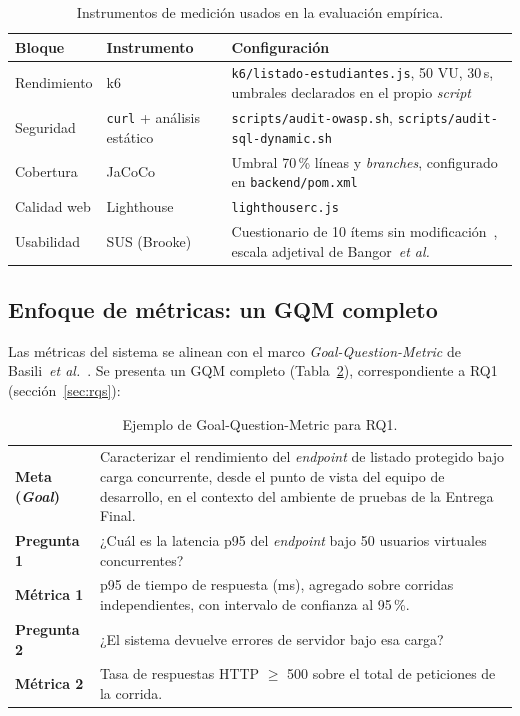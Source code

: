 \documentclass[11pt,a4paper]{article}
\newcommand{\ruta}[1]{\texttt{\footnotesize #1}}
\begin{document}
\begin{table}[htbp]
\centering
\caption{Instrumentos de medición usados en la evaluación empírica.}
\label{tab:instrumentos}
\begin{tabular}{@{}llp{7cm}@{}}
\toprule
\textbf{Bloque} & \textbf{Instrumento} & \textbf{Configuración} \\
\midrule
Rendimiento & k6 & \ruta{k6/listado-estudiantes.js}, 50 VU, 30\,s, umbrales declarados en el propio \emph{script} \\
Seguridad & \texttt{curl} + análisis estático & \ruta{scripts/audit-owasp.sh}, \ruta{scripts/audit-sql-dynamic.sh} \\
Cobertura & JaCoCo & Umbral 70\,\% líneas y \emph{branches}, configurado en \ruta{backend/pom.xml} \\
Calidad web & Lighthouse & \ruta{lighthouserc.js} \\
Usabilidad & SUS (Brooke) & Cuestionario de 10 ítems sin modificación~\cite{brooke1996}, escala adjetival de Bangor~\emph{et al.}~\cite{bangor2009} \\
\bottomrule
\end{tabular}
\end{table}

\subsection{Enfoque de métricas: un GQM completo}
\label{sec:gqm}

Las métricas del sistema se alinean con el marco \emph{Goal-Question-Metric}
de Basili~\emph{et al.}~\cite{basili1994gqm}. Se presenta un GQM completo
(Tabla~\ref{tab:gqm}), correspondiente a RQ1 (sección~\ref{sec:rqs}):

\begin{table}[htbp]
\centering
\caption{Ejemplo de Goal-Question-Metric para RQ1.}
\label{tab:gqm}
\begin{tabular}{@{}p{2.4cm}p{12cm}@{}}
\toprule
\textbf{Meta (\emph{Goal})} & Caracterizar el rendimiento del \emph{endpoint} de listado protegido bajo carga concurrente, desde el punto de vista del equipo de desarrollo, en el contexto del ambiente de pruebas de la Entrega Final. \\
\textbf{Pregunta 1} & ¿Cuál es la latencia p95 del \emph{endpoint} bajo 50 usuarios virtuales concurrentes? \\
\textbf{Métrica 1} & p95 de tiempo de respuesta (ms), agregado sobre corridas independientes, con intervalo de confianza al 95\,\%. \\
\textbf{Pregunta 2} & ¿El sistema devuelve errores de servidor bajo esa carga? \\
\textbf{Métrica 2} & Tasa de respuestas HTTP $\geq$ 500 sobre el total de peticiones de la corrida. \\
\bottomrule
\end{tabular}
\end{table}
\end{document}
